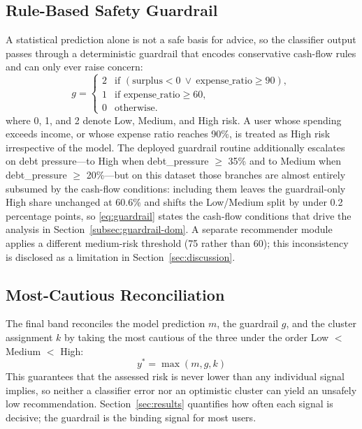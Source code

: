 \subsection{Rule-Based Safety Guardrail}\label{subsec:guardrail}
A statistical prediction alone is not a safe basis for advice, so the classifier output
passes through a deterministic guardrail that encodes conservative cash-flow rules and
can only ever raise concern:
\begin{equation}\label{eq:guardrail}
g = \begin{cases}
2 & \text{if } (\text{surplus} < 0 \ \lor\ \text{expense\_ratio} \geq 90),\\
1 & \text{if } \text{expense\_ratio} \geq 60,\\
0 & \text{otherwise.}
\end{cases}
\end{equation}
where 0, 1, and 2 denote Low, Medium, and High risk. A user whose spending exceeds
income, or whose expense ratio reaches 90\%, is treated as High risk irrespective of the
model. The deployed guardrail routine additionally escalates on debt pressure---to High
when debt\_pressure $\geq$ 35\% and to Medium when debt\_pressure $\geq$ 20\%---but on
this dataset those branches are almost entirely subsumed by the cash-flow conditions:
including them leaves the guardrail-only High share unchanged at 60.6\% and shifts the
Low/Medium split by under 0.2 percentage points, so \eqref{eq:guardrail} states the
cash-flow conditions that drive the analysis in Section~\ref{subsec:guardrail-dom}. A
separate recommender module applies a different medium-risk threshold (75 rather than
60); this inconsistency is disclosed as a limitation in Section~\ref{sec:discussion}.

\subsection{Most-Cautious Reconciliation}\label{subsec:reconciliation}
The final band reconciles the model prediction $m$, the guardrail $g$, and the cluster
assignment $k$ by taking the most cautious of the three under the order Low $<$ Medium
$<$ High:
\begin{equation}\label{eq:reconcile}
y^{*} = \max(m, g, k)
\end{equation}
This guarantees that the assessed risk is never lower than any individual signal implies,
so neither a classifier error nor an optimistic cluster can yield an unsafely low
recommendation. Section~\ref{sec:results} quantifies how often each signal is decisive;
the guardrail is the binding signal for most users.

